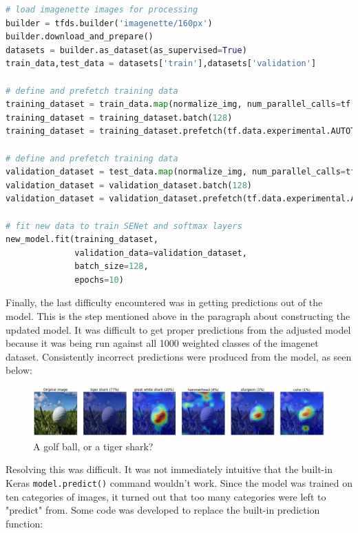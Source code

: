 \documentclass{article}
\begin{document}
\begin{lstlisting}[language=Python]
# load imagenette images for processing
builder = tfds.builder('imagenette/160px')
builder.download_and_prepare()
datasets = builder.as_dataset(as_supervised=True)
train_data,test_data = datasets['train'],datasets['validation']

# define and prefetch training data
training_dataset = train_data.map(normalize_img, num_parallel_calls=tf.data.experimental.AUTOTUNE)
training_dataset = training_dataset.batch(128)
training_dataset = training_dataset.prefetch(tf.data.experimental.AUTOTUNE)

# define and prefetch training data
validation_dataset = test_data.map(normalize_img, num_parallel_calls=tf.data.experimental.AUTOTUNE)
validation_dataset = validation_dataset.batch(128)
validation_dataset = validation_dataset.prefetch(tf.data.experimental.AUTOTUNE)

# fit new data to train SENet and softmax layers
new_model.fit(training_dataset,
              validation_data=validation_dataset,
              batch_size=128,
              epochs=10)
\end{lstlisting}

\par Finally, the last difficulty encountered was in getting predictions out of the model.
This is the step mentioned above in the paragraph about constructing the updated model.
It was difficult to get proper predictions from the adjusted model because it was being run against all 1000 weighted classes of the imagenet dataset. 
Consistently incorrect predictions were produced from the model, as seen below:

\begin{figure}[H]
    \centering
    \includegraphics[width=6in]{csci-8110/hw-3/images/bad_predicts.png}
    \caption{A golf ball, or a tiger shark?}
    \label{fig:bad_predicts}
\end{figure}

\par Resolving this was difficult.
It was not immediately intuitive that the built-in Keras \lstinline{model.predict()} command wouldn't work.
Since the model was trained on ten categories of images, it turned out that too many categories were left to "predict" from.
Some code was developed to replace the built-in prediction function:
\end{document}
